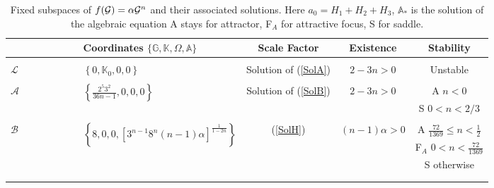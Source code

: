\documentclass[a4paper,aps,onecolumn,nofootinbib]{revtex4}
\def\rf#1{(\ref{#1})}
\newcommand{\A}{\mathbb{A}}
\begin{document}
\begin{table}
\caption{Fixed subspaces of $f({\cal G})=\alpha {\cal G}^{n}$ and their  associated solutions. Here $a_0=H_1+H_2+H_3$, $\mathbb{A}_*$ is the solution of the algebraic equation A stays for attractor, F$_A$ for attractive focus, S for saddle. } \label{TableFPEx1}
\begin{tabular}{llccc} \hline\hline
~~~~~~~~~~~& Coordinates $\{\mathbb{G},\mathbb{K},\Omega, \A\}$  & Scale Factor&Existence  & Stability\\ \hline\\
$\mathcal{L}$ & $\left\{0, \mathbb{K}_0, 0 , 0\right\}$ & Solution of \rf{SolA} &$2-3n>0$ & Unstable  \\ \\
\multirow{2}{*}{$\mathcal{A}$} & \multirow{2}{*}{$\left\{  \frac{2^5 3^2}{36 n-1},0, 0 ,0\right\}$ } & \multirow{2}{*}{Solution of \rf{SolB}} & \multirow{2}{*}{$2-3n>0$}& A $n<0$\\ 
&&&&S $0<n<2/3$ \\ \\
\multirow{3}{*}{$\mathcal{B}$} & \multirow{3}{*}{$\left\{8, 0, 0 , \left[3^{n-1} 8^n (n-1) \alpha \right]^{\frac{1}{1-2 n}}\right\}$}  & \multirow{3}{*}{\rf{SolH}} & \multirow{3}{*}{$(n-1) \alpha >0$} & A $\frac{72}{1369}\leq n<\frac{1}{2}$ \\
&&&& F$_A$  $0<n<\frac{72}{1369}$\\ 
&&&& S  otherwise\\ \\ 
\hline\hline\\
 \end{tabular}
\end{table}
 

 
\end{document}
